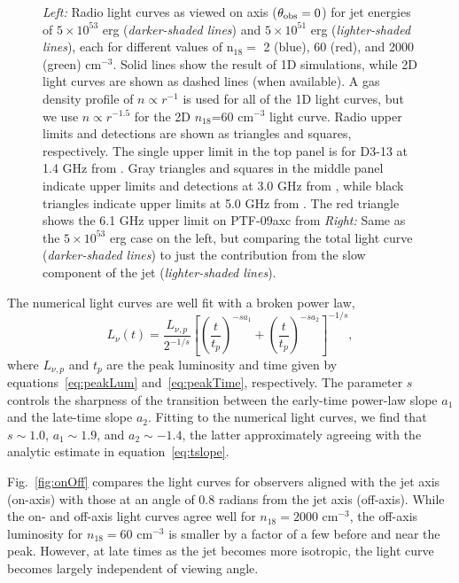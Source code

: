 \documentclass[usenatbib,fleqn]{mnras}
\begin{document}
\begin{figure}
  \caption{\label{fig:lightcurves} \textit{Left:} Radio light curves
    as viewed on axis ($\theta_{\rm obs}=0$) for jet energies of
    $5\times 10^{53}$ erg ({\it darker-shaded lines}) and $5\times
    10^{51}$ erg ({\it lighter-shaded lines}), each for different
    values of n$_{18}=$ 2 (blue), 60 (red), and 2000 (green)
    cm$^{-3}$.  Solid lines show the result of 1D simulations, while
    2D light curves are shown as dashed lines (when available).  A gas
    density profile of $n\propto r^{-1}$ is used for all of the 1D
    light curves, but we use $n\propto r^{-1.5}$ for the 2D
    $n_{18}$=60 cm$^{-3}$ light curve.  Radio upper limits and
    detections are shown as triangles and squares, respectively.  The
    single upper limit in the top panel is for D3-13 at 1.4 GHz from
    \citet{Bower2011}.  Gray triangles and squares in the middle panel
    indicate upper limits and detections at 3.0 GHz from
    \citet{Bower+2013}, while black triangles indicate upper limits at
    5.0 GHz from \citet{van-Velzen+2013}.  The red triangle shows the
    6.1 GHz upper limit on PTF-09axc from \citet{Arcavi+2014}
    \textit{Right:} Same as the $5\times 10^{53}$ erg case on the
    left, but comparing the total light curve ({\it darker-shaded
      lines}) to just the contribution from the slow component of the
    jet ({\it lighter-shaded lines}).}
\end{figure}

The numerical light curves are well fit with a broken power law,
\begin{equation}
L_\nu (t) =\frac{L_{\nu, p}}{2^{-1/s}}
\left[\left(\frac{t}{t_p}\right)^{-s
    a_1}+\left(\frac{t}{t_p}\right)^{-s a_2}\right]^{-1/s}, 
\label{eq:lcAnal}\end{equation}
where $L_{\nu, p}$ and $t_p$ are the peak luminosity and time given by
equations~\eqref{eq:peakLum} and~\eqref{eq:peakTime}, respectively.
The parameter $s$ controls the sharpness of the transition between the
early-time power-law slope $a_1$ and the late-time slope $a_2$.
Fitting to the numerical light curves, we find that $s\sim 1.0$,
$a_1\sim 1.9$, and $a_2\sim -1.4$, the latter approximately agreeing
with the analytic estimate in equation~\eqref{eq:tslope}.


Fig.~\ref{fig:onOff} compares the light curves for observers aligned
with the jet axis (on-axis) with those at an angle of 0.8 radians from
the jet axis (off-axis).  While the on- and off-axis light curves
agree well for $n_{18}=2000$ cm$^{-3}$, the off-axis luminosity for
$n_{18}=60$ cm$^{-3}$ is smaller by a factor of a few before and near
the peak.  However, at late times as the jet becomes more isotropic,
the light curve becomes largely independent of viewing angle.
\end{document}
